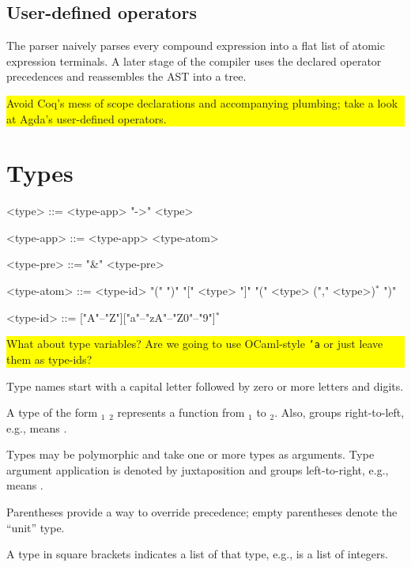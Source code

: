 \documentclass{article}
\def\<#1>{\synt{#1}}
\newcommand{\fixme}[1]{
  \noindent\colorbox{yellow}{\parbox{\dimexpr\linewidth-2\fboxsep}{#1}}%
}
\begin{document}
\subsection{User-defined operators}

The parser naively parses every compound expression into a flat list of atomic
expression terminals. A later stage of the compiler uses the declared operator
precedences and reassembles the AST into a tree.

\fixme{Avoid Coq's mess of scope declarations and accompanying plumbing; take
a look at Agda's user-defined operators.}

\section{Types}

\setlength{\grammarindent}{6em}
\begin{grammar}
<type> ::= <type-app> "->" <type>

<type-app> ::= <type-app> <type-atom>

<type-pre> ::= "&" <type-pre>

<type-atom> ::= <type-id>
\alt "(" ")"
\alt "[" <type> "]"
\alt "(" <type> ("," <type>)$^*$ ")"

<type-id> ::= ["A"--"Z"]["a"--"zA"--"Z0"--"9"]$^*$
\end{grammar}

\fixme{What about type variables?  Are we going to use OCaml-style \texttt{'a}
  or just leave them as type-ids?}

Type names start with a capital letter followed by zero or more
letters and digits.

A type of the form \<type>$_1$ \lit*{->} \<type>$_2$ represents a function
from \<type>$_1$ to \<type>$_2$. Also, \lit*{->} groups
right-to-left, e.g.,
 \lit*{->}  \lit*{->} 
means
 \lit*{->} \lit*{(}  \lit*{->}  \lit*{)}.

Types may be polymorphic and take one or more types as arguments.
Type argument application is denoted by juxtaposition and groups
left-to-right, e.g.,
  
means
\lit*{(}   \lit*{)} .

Parentheses provide a way to override precedence; empty parentheses
\lit*{()} denote the ``unit'' type.

A type in square brackets indicates a list of that type, e.g.,
\lit*{[}  \lit*{]} is a list of integers.
\end{document}
